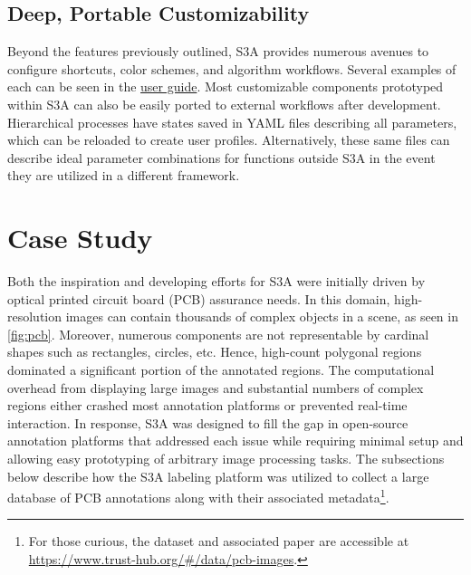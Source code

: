 \makeCropExportsFig

\subsection{Deep, Portable Customizability}
Beyond the features previously outlined, S3A provides numerous avenues to configure shortcuts, color schemes, and algorithm workflows.
Several examples of each can be seen in the \href{https://gitlab.com/s3a/s3a/-/wikis/docs/user's-guide}{user guide}.
Most customizable components prototyped within S3A can also be easily ported to external workflows after development.
Hierarchical processes have states saved in YAML files describing all parameters, which can be reloaded to create user profiles.
Alternatively, these same files can describe ideal parameter combinations for functions outside S3A in the event they are utilized in a different framework.

\section{Case Study}\label{sec:casestudy}
Both the inspiration and developing efforts for S3A were initially driven by optical printed circuit board (PCB) assurance needs.
In this domain, high-resolution images can contain thousands of complex objects in a scene, as seen in \autoref{fig:pcb}.
Moreover, numerous components are not representable by cardinal shapes such as rectangles, circles, etc.
Hence, high-count polygonal regions dominated a significant portion of the annotated regions.
The computational overhead from displaying large images and substantial numbers of complex regions either crashed most annotation platforms or prevented real-time interaction.
In response, S3A was designed to fill the gap in open-source annotation platforms that addressed each issue while requiring minimal setup and allowing easy prototyping of arbitrary image processing tasks.
The subsections below describe how the S3A labeling platform was utilized to collect a large database of PCB annotations along with their associated metadata\footnote{For those curious, the dataset and associated paper are accessible at \url{https://www.trust-hub.org/\#/data/pcb-images}.}.

\makePcbFig


